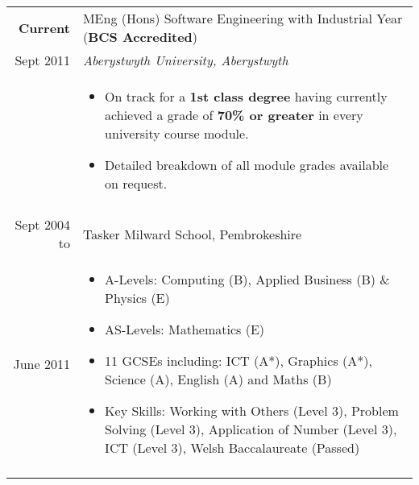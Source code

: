 \documentclass[a4paper, 10pt]{extarticle} %
\begin{document}
\begin{tabular}{r | p{13cm}}	


\textbf{Current}
		
		 & 
		 
		 MEng (Hons) Software Engineering with Industrial Year (\textbf{BCS Accredited})  \\
		 
			Sept 2011
		 
		& 
		 
		\textit{Aberystwyth University, Aberystwyth} \\ 
		
& 

\footnotesize{

\vspace{-0.3cm}

\begin{itemize}[leftmargin=*]
\item On track for a \textbf{1st class degree} having currently achieved a grade of \textbf{70\% or greater} in every university course module. 

\item Detailed breakdown of all module grades available on request.

\vspace{-0.4cm}

\end{itemize}
} \\

\multicolumn{2}{c}{} \\

Sept 2004 to
		
		 & 
		 
		 Tasker Milward School, Pembrokeshire  \\
		 
			June 2011
		 
		& 
	
\footnotesize{

\vspace{-0.3cm}

\begin{itemize}[leftmargin=*]
\item A-Levels: Computing (B), Applied Business (B) \& Physics (E)

\item AS-Levels: Mathematics (E)

\item 11 GCSEs including: ICT (A*), Graphics (A*), Science (A), English (A) and Maths (B)

\item Key Skills: Working with Others (Level 3), Problem Solving (Level 3), Application of Number (Level 3), ICT (Level 3), Welsh Baccalaureate (Passed)

\vspace{-0.4cm}

\end{itemize}
} \\

\multicolumn{2}{c}{} 

\end{tabular}
\end{document}
